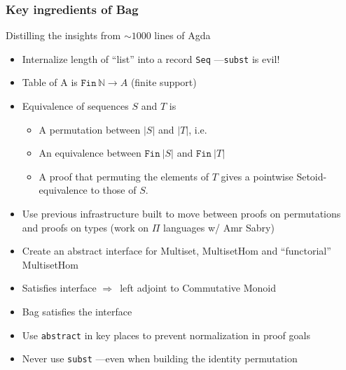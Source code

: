 \documentclass[serif,mathserif,professionalfont,10pt]{beamer}
\begin{document}
\begin{frame}
\frametitle{Key ingredients of Bag}
Distilling the insights from $\sim \! 1000$ lines of Agda \pause
\begin{itemize}
\item<1-> Internalize length of ``list'' into a record \texttt{Seq} ---\texttt{subst} is evil!
\item<2-> Table of A is $\texttt{Fin}\, \mathbb{N} \rightarrow A$ (finite
  support)
\item<3-> Equivalence of sequences $S$ and $T$ is
\begin{itemize}
\item<4-> A permutation between $|S|$ and $|T|$, i.e.
\item<5-> An equivalence between $\texttt{Fin}~ |S|$ and $\texttt{Fin}~ |T|$
\item<6-> A proof that permuting the elements of $T$ gives a
pointwise Setoid-equivalence to those of $S$.
\end{itemize}
\item<7-> Use previous infrastructure built to move between proofs
on permutations and proofs on types (work on $\Pi$ languages
w/ Amr Sabry)
\item<8-> Create an abstract interface for Multiset, MultisetHom and 
``functorial'' MultisetHom
\item<9-> Satisfies interface $\Rightarrow$\ left
adjoint to Commutative Monoid
\item<10-> Bag satisfies the interface
\item<11-> Use \texttt{abstract} in key places to prevent normalization
in proof goals
\item<12-> Never use \texttt{subst} ---even when building the identity permutation
\end{itemize}
\end{frame}
\end{document}
